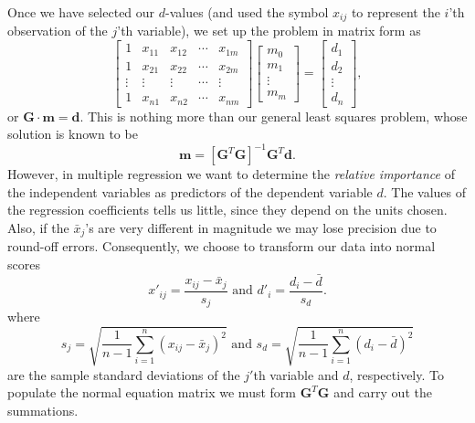 Once we have selected our $d$-values (and used the symbol $x_{ij}$ to represent the $i$'th observation
of the $j$'th variable), we set up the problem in matrix form as
\begin{equation}
\left [ \begin{array}{ccccc}
1 & x_{11} & x_{12} &  \cdots & x_{1m} \\
1 & x_{21} & x_{22} &  \cdots & x_{2m} \\
\vdots & \vdots & \vdots & \cdots & \vdots \\
1 & x_{n1} & x_{n2} & \cdots & x_{nm} \end{array}\right ]
\left [ \begin{array}{c}
m_0\\ m_1\\ \vdots \\ m_m \end{array} \right ]  = 
\left [ \begin{array}{c}
d_1 \\ d_2\\ \vdots \\  d_n
\end{array} \right ],
\end{equation}	 
or $\mathbf{G\cdot m = d}$.  This is nothing more than our general least squares problem, whose solution is known to be 
\begin{equation}
\mathbf{m} = [ \mathbf{G}^T\mathbf{G} ]^{-1} \mathbf{G}^T\mathbf{d}.
\end{equation}	 	
However, in multiple regression we want to determine the \emph{relative importance} of the independent variables 
as predictors of the dependent variable $d$.  The values of the regression coefficients tells us little, 
since they depend on the units chosen.  Also, if the $\bar{x}_j$'s are very different in magnitude we may lose 
precision due to round-off errors.  Consequently, we choose to transform our data into normal scores
\begin{equation}
x'_{ij} = \frac{x_{ij} - \bar{x}_j}{s_j} \mbox{ and } d'_i = \frac{d_i - \bar{d}}{s_d}.
\end{equation}
where
\begin{equation}
s_j = \sqrt{ \frac{1}{n-1} \sum ^n _{i=1} (x_{ij} - \bar{x}_j)^2} \mbox{ and } s_d = \sqrt{ \frac{1}{n-1} \sum ^n _{i=1} (d_i - \bar{d})^2}
\end{equation}	 
are the sample standard deviations of the $j'$th variable and $d$, respectively.  To populate the normal equation matrix we must form 
$\mathbf{G}^T\mathbf{G}$ and carry out the summations.  
